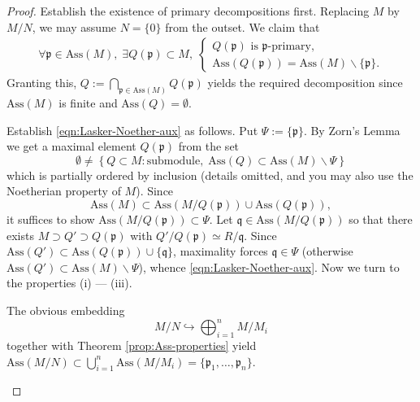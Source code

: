 \begin{proof}
	Establish the existence of primary decompositions first. Replacing $M$ by $M/N$, we may assume $N = \{0\}$ from the outset. We claim that
	\begin{gather}\label{eqn:Lasker-Noether-aux}
		\forall \mathfrak{p} \in \text{Ass}(M), \; \exists Q(\mathfrak{p}) \subset M, \;
		\left\{ \begin{array}{l}
			Q(\mathfrak{p}) \text{ is } \mathfrak{p}\text{-primary}, \\
			\text{Ass}(Q(\mathfrak{p})) = \text{Ass}(M) \smallsetminus \{ \mathfrak{p} \}. 
		\end{array}\right.
	\end{gather}
	Granting this, $Q := \bigcap_{\mathfrak{p} \in \text{Ass}(M)} Q(\mathfrak{p})$ yields the required decomposition since $\text{Ass}(M)$ is finite and $\text{Ass}(Q) = \emptyset$.
	
	Establish \eqref{eqn:Lasker-Noether-aux} as follows. Put $\Psi := \{ \mathfrak{p} \}$. By Zorn's Lemma we get a maximal element $Q(\mathfrak{p})$ from the set
	\[ \emptyset \neq \left\{  Q \subset M: \text{submodule}, \; \text{Ass}(Q) \subset \text{Ass}(M) \smallsetminus \Psi \right\} \]
	which is partially ordered by inclusion (details omitted, and you may also use the Noetherian property of $M$). Since
	\[ \text{Ass}(M) \subset \text{Ass}(M/Q(\mathfrak{p})) \cup \text{Ass}(Q(\mathfrak{p})), \]
	it suffices to show $\text{Ass}(M/Q(\mathfrak{p})) \subset \Psi$.  Let $\mathfrak{q} \in \text{Ass}(M/Q(\mathfrak{p}))$ so that there exists $M \supset Q' \supset Q(\mathfrak{p})$ with $Q'/Q(\mathfrak{p}) \simeq R/\mathfrak{q}$. Since $\text{Ass}(Q') \subset \text{Ass}(Q(\mathfrak{p})) \cup \{ \mathfrak{q} \}$, maximality forces $\mathfrak{q} \in \Psi$ (otherwise $\text{Ass}(Q') \subset \text{Ass}(M) \smallsetminus \Psi$), whence \eqref{eqn:Lasker-Noether-aux}. Now we turn to the properties (i) --- (iii).
	
	\begin{asparaenum}[(i)]
		\item The obvious embedding
		\[ M/N \hookrightarrow \bigoplus_{i=1}^n M/M_i \]
		together with Theorem \ref{prop:Ass-properties} yield $\text{Ass}(M/N) \subset \bigcup_{i=1}^n \text{Ass}(M/M_i) = \{ \mathfrak{p}_1, \ldots, \mathfrak{p}_n \}$.
		

\end{asparaenum}
\end{proof}
